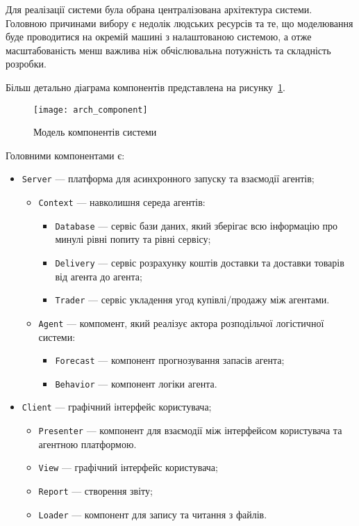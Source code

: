 Для реалізації системи була обрана централізована архітектура системи. 
Головною причинами вибору є недолік людських ресурсів та те, що моделювання буде проводитися на окремій машині з налаштованою системою, а отже масштабованість менш важлива ніж обчіслювальна потужність та складність розробки.    

Більш детально діаграма компонентів представлена на рисунку~\ref{fig:arch_component}.

\begin{figure}[H]
	\centering
	\texttt{[image: arch\_component]}
	\caption{Модель компонентів системи}
	\label{fig:arch_component}
\end{figure} 

Головними компонентами є:
\begin{itemize}
	\item \texttt{Server} --- платформа для асинхронного запуску та взаємодії агентів;
	\begin{itemize}
		\item \texttt{Context} --- навколишня середа агентів:
		\begin{itemize}
			\item \texttt{Database} --- сервіс бази даних, який зберігає всю інформацію про минулі рівні попиту та рівні сервісу;  
			\item \texttt{Delivery} --- сервіс розрахунку коштів доставки та доставки товарів від агента до агента;
			\item \texttt{Trader} --- сервіс укладення угод купівлі/продажу між агентами.
		\end{itemize}
		\item \texttt{Agent} --- компомент, який реалізує актора розподільчої логістичної системи:
		\begin{itemize}
			\item \texttt{Forecast} --- компонент прогнозування запасів агента;
			\item \texttt{Behavior} --- компонент логіки агента.
		\end{itemize}
	\end{itemize}
	\item \texttt{Client} --- графічний інтерфейс користувача;
	\begin{itemize}	
		\item \texttt{Presenter} --- компонент для взаємодії між інтерфейсом користувача та агентною платформою.
		\item \texttt{View} --- графічний інтерфейс користувача;
		\item \texttt{Report} --- створення звіту;
		\item \texttt{Loader} --- компонент для запису та читання з файлів.
	\end{itemize}
\end{itemize}


